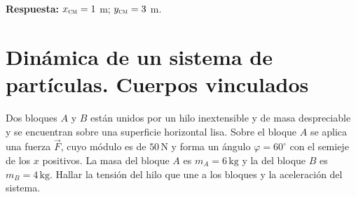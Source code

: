 \documentclass[addpoints]{exam}
\newcommand{\grado}[0]{^{\circ}}
\newcommand{\rta}{\textbf{Respuesta: }}
\begin{document}
\begin{questions}
    \rta $x_{\textsc{cm}} = 1$ m; $y_{\textsc{cm}} = 3$ m.

    \section{Dinámica de un sistema de partículas. Cuerpos vinculados}

    \question Dos bloques $A$ y $B$ están unidos por un hilo inextensible y de masa despreciable y se encuentran sobre una superficie horizontal lisa. Sobre el bloque $A$ se aplica una fuerza $\vec{F}$, cuyo módulo es de $50 \, \text{N}$ y forma un ángulo $\varphi = 60\grado$ con el semieje de los $x$ positivos. La masa del bloque $A$ es $m_A = 6 \, \text{kg}$ y la del bloque $B$ es $m_B = 4 \, \text{kg}$.  Hallar la tensión del hilo que une a los bloques y la aceleración del sistema. \label{ej:vinculados1}


\end{questions}
\end{document}
